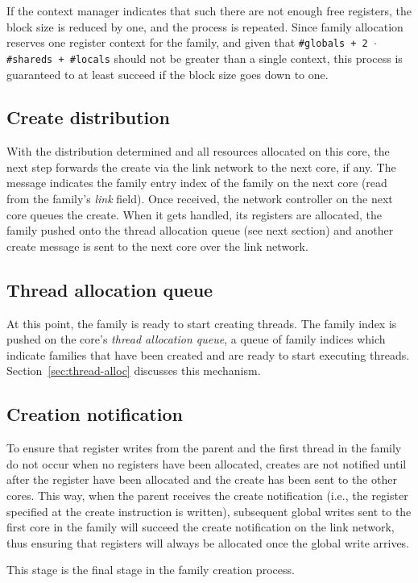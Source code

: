If the context manager indicates that such there are not enough free registers, the block size is reduced by one, and the process is repeated. Since family allocation reserves one register context for the family, and given that {\tt \#globals + 2 $\cdot$ \#shareds + \#locals} should not be greater than a single context, this process is guaranteed to at least succeed if the block size goes down to one.

\subsection{Create distribution}
With the distribution determined and all resources allocated on this core, the next step forwards the create via the link network to the next core, if any. The message indicates the family entry index of the family on the next core (read from the family's \emph{link} field). Once received, the network controller on the next core queues the create. When it gets handled, its registers are allocated, the family pushed onto the thread allocation queue (see next section) and another create message is sent to the next core over the link network.

\subsection{Thread allocation queue}
At this point, the family is ready to start creating threads. The family index is pushed on the core's \emph{thread allocation queue}, a queue of family indices which indicate families that have been created and are ready to start executing threads. Section~\ref{sec:thread-alloc} discusses this mechanism.

\subsection{Creation notification}
To ensure that register writes from the parent and the first thread in the family do not occur when no registers have been allocated, creates are not notified until after the register have been allocated and the create has been sent to the other cores. This way, when the parent receives the create notification (i.e., the register specified at the create instruction is written), subsequent global writes sent to the first core in the family will succeed the create notification on the link network, thus ensuring that registers will always be allocated once the global write arrives.

This stage is the final stage in the family creation process.

